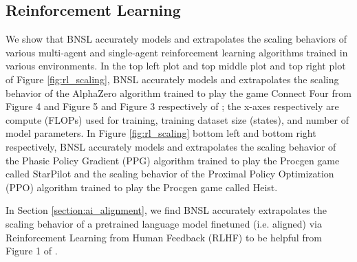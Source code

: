 \documentclass{article} %
\begin{document}
\vspace{-3.9mm}

\subsection{Reinforcement Learning}
\label{section:reinforcement_learning}

\vspace{-3.9mm}

We show that BNSL accurately models and extrapolates the scaling behaviors of various multi-agent and single-agent reinforcement learning algorithms trained in various environments. In the top left plot and top middle plot and top right plot of Figure \ref{fig:rl_scaling}, BNSL accurately models and extrapolates the scaling behavior of the AlphaZero algorithm trained to play the game Connect Four from Figure 4 and Figure 5 and Figure 3 respectively of \cite{neumann2022scaling}; the x-axes respectively are compute (FLOPs) used for training, training dataset size (states), and number of model parameters. In Figure \ref{fig:rl_scaling} bottom left and bottom right respectively, BNSL accurately models and extrapolates the scaling behavior of the Phasic Policy Gradient (PPG) algorithm \citep{cobbe2021phasic} trained to play the Procgen \citep{cobbe2020leveraging} game called StarPilot and the scaling behavior of the Proximal Policy Optimization (PPO) algorithm \citep{schulman2017proximal} trained to play the Procgen \citep{cobbe2020leveraging} game called Heist.

\vspace{-1.0mm}

In Section \ref{section:ai_alignment}, we find BNSL accurately extrapolates the scaling behavior of a pretrained language model finetuned (i.e. aligned) via Reinforcement Learning from Human Feedback (RLHF) to be helpful from Figure 1 of \cite{bai2022training}.
\end{document}
